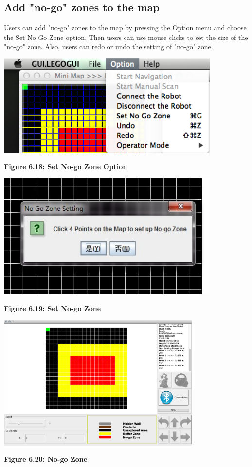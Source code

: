 \documentclass[11pt, a4paper]{report}
\begin{document}
\subsection{Add "no-go" zones to the map}
Users can add "no-go" zones to the map by  pressing the Option menu and choose the Set No Go Zone option. Then users can use mouse clicks to set the size of the "no-go" zone. Also, users can redo or undo the setting of "no-go" zone.
  \begin{center}
 \includegraphics[width=11.20cm]{NoGoZoneOption.png}
\end{center}
\begin{center}
\textbf {Figure 6.18: Set No-go Zone Option} \\[0.3cm]
\end{center}
  \begin{center}
 \includegraphics[width=11.20cm]{setNoGoZone1.jpg}
\end{center}
\begin{center}
\textbf {Figure 6.19: Set No-go Zone} \\[0.3cm]
\end{center}
  \begin{center}
 \includegraphics[width=10.20cm]{NoGoZone.png}
\end{center}
\begin{center}
\textbf {Figure 6.20: No-go Zone} \\[0.3cm]
\end{center}
\end{document}
